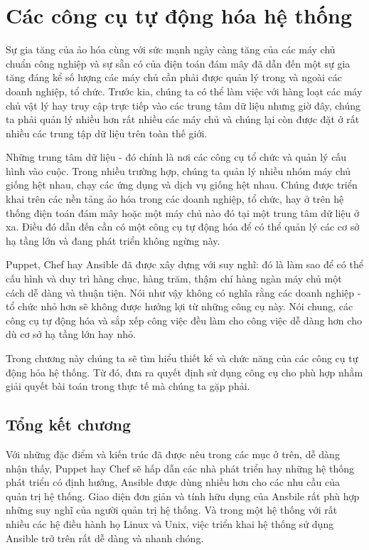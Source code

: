 \chapter{Các công cụ tự động hóa hệ thống}

\newpage
\clearpage

Sự gia tăng của ảo hóa cùng với sức mạnh ngày càng tăng của các máy chủ chuẩn công nghiệp và sự sẵn có của điện toán đám mây đã dẫn đến một sự gia tăng đáng kể số lượng các máy chủ cần phải được quản lý trong và ngoài các doanh nghiệp, tổ chức. Trước kia, chúng ta có thể làm việc với hàng loạt các máy chủ vật lý hay truy cập trực tiếp vào các trung tâm dữ liệu nhưng giờ đây, chúng ta phải quản lý nhiều hơn rất nhiều các máy chủ và chúng lại còn được đặt ở rất nhiều các trung tập dữ liệu trên toàn thế giới.

Những trung tâm dữ liệu - đó chính là nơi các công cụ tổ chức và quản lý cấu hình vào cuộc. Trong nhiều trường hợp, chúng ta quản lý nhiều nhóm máy chủ giống hệt nhau, chạy các ứng dụng và dịch vụ giống hệt nhau. Chúng được triển khai trên các nền tảng ảo hóa trong các doanh nghiệp, tổ chức, hay ở trên hệ thống điện toán đám mây hoặc một máy chủ nào đó tại một trung tâm dữ liệu ở xa. Điều đó dẫn đến cần có một công cụ tự động hóa để có thể quản lý các cơ sở hạ tầng lớn và đang phát triển không ngừng này.

Puppet, Chef hay Ansible đã được xây dựng với suy nghĩ: đó là làm sao để có thể cấu hình và duy trì hàng chục, hàng trăm, thậm chí hàng ngàn máy chủ một cách dễ dàng và thuận tiện. Nói như vậy không có nghĩa rằng các doanh nghiệp - tổ chức nhỏ hơn sẽ không được hưởng lợi từ những công cụ này. Nói chung, các công cụ tự động hóa và sắp xếp công việc đều làm cho công việc dễ dàng hơn cho dù cơ sở hạ tầng lớn hay nhỏ.

Trong chương này chúng ta sẽ tìm hiểu thiết kế và chức năng của các công cụ tự động hóa hệ thống. Từ đó, đưa ra quyết định sử dụng công cụ cho phù hợp nhằm giải quyết bài toán trong thực tế mà chúng ta gặp phải.

\newpage
\clearpage

\newpage
\clearpage

\newpage
\clearpage

\newpage
\clearpage

\section{Tổng kết chương}

Với những đặc điểm và kiến trúc đã được nêu trong các mục ở trên, dễ dàng nhận thấy, Puppet hay Chef sẽ hấp dẫn các nhà phát triển hay những hệ thống phát triển có định hướng, Ansible được dùng nhiều hơn cho các nhu cầu của quản trị hệ thống. Giao diện đơn giản và tính hữu dụng của Ansbile rất phù hợp những suy nghĩ của người quản trị hệ thống. Và trong một hệ thống với rất nhiều các hệ điều hành họ Linux và Unix, việc triển khai hệ thống sử dụng Ansible trở trên rất dễ dàng và nhanh chóng.

